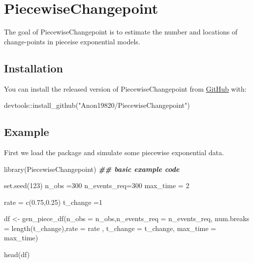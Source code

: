 \documentclass[
]{article}
\author{}
\date{\vspace{-2.5em}}
\newenvironment{Shaded}{\begin{snugshade}}{\end{snugshade}}
\newcommand{\AttributeTok}[1]{\textcolor[rgb]{0.77,0.63,0.00}{#1}}
\newcommand{\DecValTok}[1]{\textcolor[rgb]{0.00,0.00,0.81}{#1}}
\newcommand{\DocumentationTok}[1]{\textcolor[rgb]{0.56,0.35,0.01}{\textbf{\textit{#1}}}}
\newcommand{\FloatTok}[1]{\textcolor[rgb]{0.00,0.00,0.81}{#1}}
\newcommand{\FunctionTok}[1]{\textcolor[rgb]{0.00,0.00,0.00}{#1}}
\newcommand{\NormalTok}[1]{#1}
\newcommand{\OtherTok}[1]{\textcolor[rgb]{0.56,0.35,0.01}{#1}}
\newcommand{\SpecialCharTok}[1]{\textcolor[rgb]{0.00,0.00,0.00}{#1}}
\newcommand{\StringTok}[1]{\textcolor[rgb]{0.31,0.60,0.02}{#1}}
\begin{document}
\hypertarget{piecewisechangepoint}{%
\section{PiecewiseChangepoint}\label{piecewisechangepoint}}

The goal of PiecewiseChangepoint is to estimate the number and locations
of change-points in pieceise exponential models.

\hypertarget{installation}{%
\subsection{Installation}\label{installation}}

You can install the released version of PiecewiseChangepoint from
\href{https://github.com/Anon19820/PiecewiseChangepoint}{GitHub}
with:

\begin{Shaded}
\begin{Highlighting}[]
\NormalTok{devtools}\SpecialCharTok{::}\FunctionTok{install\_github}\NormalTok{(}\StringTok{"Anon19820/PiecewiseChangepoint"}\NormalTok{)}
\end{Highlighting}
\end{Shaded}

\hypertarget{example}{%
\subsection{Example}\label{example}}

First we load the package and simulate some piecewise exponential data.

\begin{Shaded}
\begin{Highlighting}[]
\FunctionTok{library}\NormalTok{(PiecewiseChangepoint)}
\DocumentationTok{\#\# basic example code}

\FunctionTok{set.seed}\NormalTok{(}\DecValTok{123}\NormalTok{)}
\NormalTok{n\_obs }\OtherTok{=}\DecValTok{300}
\NormalTok{n\_events\_req}\OtherTok{=}\DecValTok{300}
\NormalTok{max\_time }\OtherTok{=}  \DecValTok{2}

\NormalTok{rate }\OtherTok{=} \FunctionTok{c}\NormalTok{(}\FloatTok{0.75}\NormalTok{,}\FloatTok{0.25}\NormalTok{)}
\NormalTok{t\_change }\OtherTok{=}\DecValTok{1}

\NormalTok{df }\OtherTok{\textless{}{-}} \FunctionTok{gen\_piece\_df}\NormalTok{(}\AttributeTok{n\_obs =}\NormalTok{ n\_obs,}\AttributeTok{n\_events\_req =}\NormalTok{ n\_events\_req,}
                   \AttributeTok{num.breaks =} \FunctionTok{length}\NormalTok{(t\_change),}\AttributeTok{rate =}\NormalTok{ rate ,}
                   \AttributeTok{t\_change =}\NormalTok{ t\_change, }\AttributeTok{max\_time =}\NormalTok{ max\_time)}
                   
\FunctionTok{head}\NormalTok{(df)  }
\end{Highlighting}
\end{Shaded}
\end{document}
